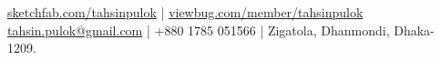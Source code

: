  {
  \href{https://sketchfab.com/tahsinpulok}{sketchfab.com/tahsinpulok} | \href{https://viewbug.com/member/tahsinpulok}{viewbug.com/member/tahsinpulok}\\
  \href{mailto:tahsin.pulok@gmail.com}{tahsin.pulok@gmail.com} | +880 1785 051566 | Zigatola, Dhanmondi, Dhaka- 1209.
}
